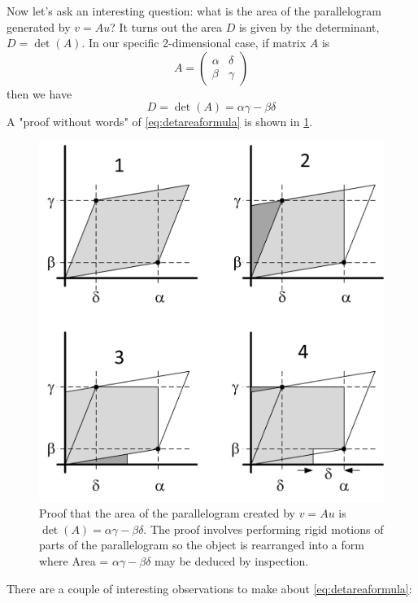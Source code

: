 \documentclass[onefignum,onetabnum]{siamart190516}
\begin{document}
Now let's ask an interesting question: what is the area of the
parallelogram generated by $v = A u$?  It turns out the area $D$ is given by
the determinant, $D = \det(A)$.  In our specific 2-dimensional case, if matrix $A$ is 
$$
A = 
\begin{pmatrix}
\alpha & \delta \\
\beta & \gamma
\end{pmatrix}
$$
then we have 
\begin{equation}
D = \det(A) = \alpha \gamma - \beta \delta
\label{eq:detareaformula}
\end{equation}
A "proof without words" of \cref{eq:detareaformula} is shown in \cref{fig:ParallelogramAreaDetFormula}.  
\begin{figure}[thb]
	\centering
	\includegraphics[width=0.7\columnwidth]{ParallelogramAreaDetFormula.png}
	\caption{Proof that the area of the parallelogram created by $v = A u$ is 
		$\det(A) =  \alpha \gamma - \beta \delta$.
	The proof involves performing rigid motions of parts of the parallelogram so the object
	is rearranged into a form where Area = $\alpha \gamma - \beta \delta$ may be deduced by inspection.}
	\label{fig:ParallelogramAreaDetFormula}
\end{figure}
There are a couple of interesting observations to make about \cref{eq:detareaformula}:
\end{document}
